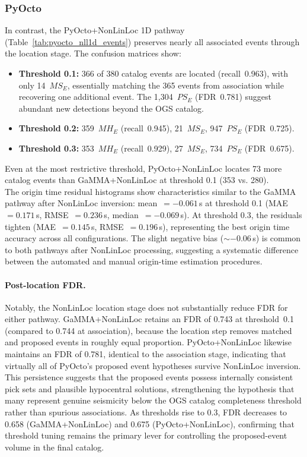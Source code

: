 \subsubsection{PyOcto}
In contrast, the PyOcto+NonLinLoc 1D pathway
(Table~\ref{tab:pyocto_nll1d_events}) preserves nearly all associated events
through the location stage. The confusion matrices show:
\begin{itemize}
  \item \textbf{Threshold 0.1:} 366 of 380 catalog events are located
    (recall~0.963), with only 14~$MS_E$, essentially matching the 365 events
    from association while recovering one additional event. The 1,304~$PS_E$
    (\ac{FDR}~0.781) suggest abundant new detections beyond the OGS catalog.
  \item \textbf{Threshold 0.2:} 359~$MH_E$ (recall~0.945), 21~$MS_E$,
    947~$PS_E$ (\ac{FDR}~0.725).
  \item \textbf{Threshold 0.3:} 353~$MH_E$ (recall~0.929), 27~$MS_E$,
    734~$PS_E$ (\ac{FDR}~0.675).
\end{itemize}
Even at the most restrictive threshold, PyOcto+NonLinLoc locates 73 more
catalog events than GaMMA+NonLinLoc at threshold 0.1 (353 vs. 280).\\

The origin time residual histograms show characteristics similar to the GaMMA
pathway after NonLinLoc inversion: mean~$= -0.061$\,s at threshold 0.1
(MAE~$=0.171$\,s, RMSE~$=0.236$\,s, median~$=-0.069$\,s). At threshold 0.3, the
residuals tighten (MAE~$=0.145$\,s, RMSE~$=0.196$\,s), representing the best
origin time accuracy across all configurations. The slight negative bias
($\sim -0.06$\,s) is common to both pathways after NonLinLoc processing,
suggesting a systematic difference between the automated and manual
origin-time estimation procedures.

\paragraph{Post-location FDR.}
Notably, the NonLinLoc location stage does not substantially reduce \ac{FDR}
for either pathway. GaMMA+NonLinLoc retains an \ac{FDR} of 0.743 at
threshold~0.1 (compared to 0.744 at association), because the location step
removes matched and proposed events in roughly equal proportion.
PyOcto+NonLinLoc likewise maintains an \ac{FDR} of 0.781, identical to the
association stage, indicating that virtually all of PyOcto's proposed event
hypotheses survive NonLinLoc inversion. This persistence suggests that the
proposed events possess internally consistent pick sets and plausible
hypocentral solutions, strengthening the hypothesis that many represent genuine
seismicity below the OGS catalog completeness threshold rather than spurious
associations. As thresholds rise to 0.3, \ac{FDR} decreases to 0.658
(GaMMA+NonLinLoc) and 0.675 (PyOcto+NonLinLoc), confirming that threshold
tuning remains the primary lever for controlling the proposed-event volume in
the final catalog.

